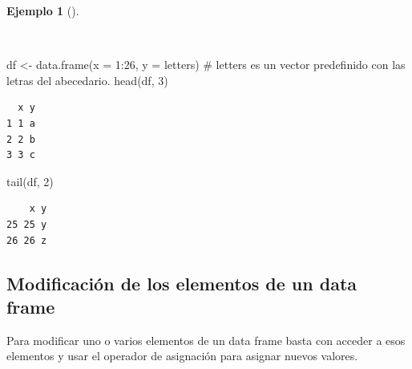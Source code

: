 \documentclass[
  a4paper,
]{scrreport}
\newenvironment{Shaded}{\begin{snugshade}}{\end{snugshade}}
\newcommand{\AttributeTok}[1]{\textcolor[rgb]{0.40,0.45,0.13}{#1}}
\newcommand{\CommentTok}[1]{\textcolor[rgb]{0.37,0.37,0.37}{#1}}
\newcommand{\DecValTok}[1]{\textcolor[rgb]{0.68,0.00,0.00}{#1}}
\newcommand{\FunctionTok}[1]{\textcolor[rgb]{0.28,0.35,0.67}{#1}}
\newcommand{\NormalTok}[1]{\textcolor[rgb]{0.00,0.23,0.31}{#1}}
\newcommand{\OtherTok}[1]{\textcolor[rgb]{0.00,0.23,0.31}{#1}}
\newcommand{\SpecialCharTok}[1]{\textcolor[rgb]{0.37,0.37,0.37}{#1}}
\theoremstyle{definition}
\theoremstyle{definition}
\newtheorem{example}{Ejemplo}[chapter]
\theoremstyle{remark}
\begin{document}
\begin{example}[]\protect\hypertarget{exm-acceso-primeras-ultimas-filas-data-frame}{}\label{exm-acceso-primeras-ultimas-filas-data-frame}

~

\begin{Shaded}
\begin{Highlighting}[]
\NormalTok{df }\OtherTok{\textless{}{-}} \FunctionTok{data.frame}\NormalTok{(}\AttributeTok{x =} \DecValTok{1}\SpecialCharTok{:}\DecValTok{26}\NormalTok{, }\AttributeTok{y =}\NormalTok{ letters) }\CommentTok{\# letters es un vector predefinido con las letras del abecedario.}
\FunctionTok{head}\NormalTok{(df, }\DecValTok{3}\NormalTok{)}
\end{Highlighting}
\end{Shaded}

\begin{verbatim}
  x y
1 1 a
2 2 b
3 3 c
\end{verbatim}

\begin{Shaded}
\begin{Highlighting}[]
\FunctionTok{tail}\NormalTok{(df, }\DecValTok{2}\NormalTok{)}
\end{Highlighting}
\end{Shaded}

\begin{verbatim}
    x y
25 25 y
26 26 z
\end{verbatim}

\end{example}

\subsection{Modificación de los elementos de un data
frame}\label{modificaciuxf3n-de-los-elementos-de-un-data-frame}

Para modificar uno o varios elementos de un data frame basta con acceder
a esos elementos y usar el operador de asignación para asignar nuevos
valores.
\end{document}
